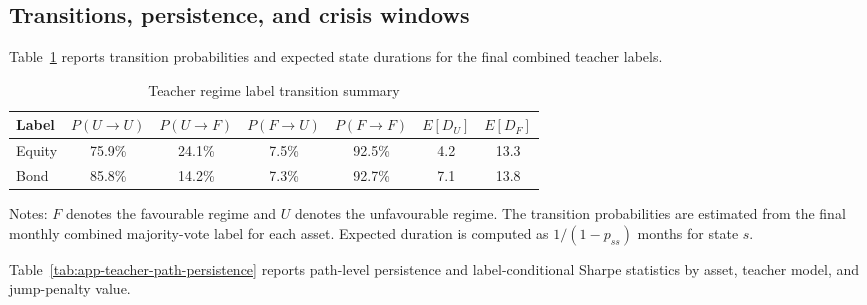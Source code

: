 \FloatBarrier
\subsection{Transitions, persistence, and crisis windows}
\label{app:teacher-transitions-persistence-crisis}

Table~\ref{tab:app-teacher-final-transitions} reports transition probabilities and expected state durations for the final combined teacher labels.


\begin{table}[H]
\centering
\caption{Teacher regime label transition summary}
\label{tab:app-teacher-final-transitions}
\small
\setlength{\tabcolsep}{5pt}
\begin{tabular}{lcccccc}
\toprule
Label & $P(U\to U)$ & $P(U\to F)$ & $P(F\to U)$ & $P(F\to F)$ & $E[D_U]$ & $E[D_F]$ \\
\midrule
Equity & 75.9\% & 24.1\% & 7.5\% & 92.5\% & 4.2 & 13.3 \\
Bond & 85.8\% & 14.2\% & 7.3\% & 92.7\% & 7.1 & 13.8 \\
\bottomrule
\end{tabular}
\par\vspace{0.35em}
\begin{minipage}{0.92\linewidth}
\footnotesize Notes: $F$ denotes the favourable regime and $U$ denotes the unfavourable regime. The transition probabilities are estimated from the final monthly combined majority-vote label for each asset. Expected duration is computed as $1/(1-p_{ss})$ months for state $s$.
\end{minipage}
\end{table}


Table~\ref{tab:app-teacher-path-persistence} reports path-level persistence and label-conditional Sharpe statistics by asset, teacher model, and jump-penalty value.


